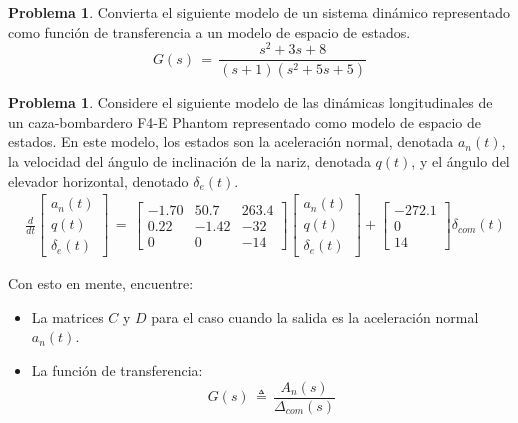 \documentclass[ a4paper, twoside, 11pt]{article}
\newcommand{\define}{\triangleq}
\theoremstyle{definition}
\newtheorem{problem}[definition]{Problema}
\begin{document}
\begin{problem}
Convierta el siguiente modelo de un sistema din\'amico representado como funci\'on de transferencia a un modelo de espacio de estados. 
\[
G(s) \, = \, 
\frac{ s^2 + 3s + 8 }{(s + 1) ( s^2 + 5s + 5 )}
\]

\end{problem}
\vspace{\baselineskip}

\begin{problem} Considere el siguiente modelo de las din\'amicas longitudinales de un caza-bombardero F4-E Phantom representado como modelo de espacio de estados. En este modelo, los estados son la aceleraci\'on normal, denotada $a_n(t)$, la velocidad del \'angulo de inclinaci\'on de la nariz, denotada $q(t)$, y el \'angulo del elevador horizontal, denotado $\delta_e(t)$. 
\begin{align*}
& \frac{d}{dt}
\left[ \begin{array}{c}
a_n(t) \\ q(t) \\ \delta_e(t)
\end{array} \right] \, = \, 
\left[ \begin{array}{ccc}
-1.70 & 50.7 & 263.4 \\
0.22 & -1.42 & -32 \\
0 & 0 & -14
\end{array} \right] 
\left[ \begin{array}{c}
a_n(t) \\ q(t) \\ \delta_e(t)
\end{array} \right]
+ \left[ \begin{array}{c}
-272.1 \\ 0 \\ 14
\end{array} \right] \delta_{com}(t)
\end{align*}

Con esto en mente, encuentre: 
\begin{itemize}
\item La matrices $C$ y $D$ para el caso cuando la salida es la aceleraci\'on normal $a_n(t)$. 
\item La funci\'on de transferencia: 
\[
G(s) \, \define \, \frac{A_n(s)}{\Delta_{com}(s)}
\]
\end{itemize}

\end{problem}
\vspace{\baselineskip}
\end{document}
